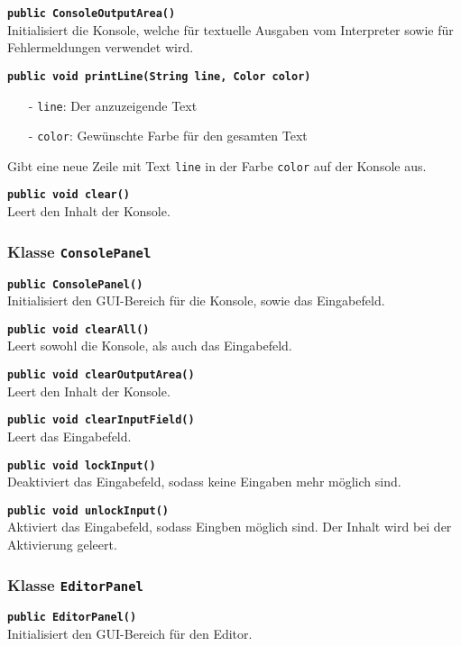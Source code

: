 \documentclass[parskip=full,11pt,twoside]{scrartcl}
\begin{document}
\textbf{\texttt{public ConsoleOutputArea()}}\\
Initialisiert die Konsole, welche für textuelle Ausgaben vom Interpreter sowie für Fehlermeldungen verwendet wird.

\textbf{\texttt{public void printLine(String line, Color color)}}
\begin{itemize}[noitemsep]
	\item[-] \texttt{line}: Der anzuzeigende Text
	\item[-] \texttt{color}: Gewünschte Farbe für den gesamten Text
\end{itemize}
Gibt eine neue Zeile mit Text \texttt{line} in der Farbe \texttt{color} auf der Konsole aus.

\textbf{\texttt{public void clear()}}\\
Leert den Inhalt der Konsole.

\subsubsection{Klasse \texttt{ConsolePanel}}

\textbf{\texttt{public ConsolePanel()}}\\
Initialisiert den GUI-Bereich für die Konsole, sowie das Eingabefeld.

\textbf{\texttt{public void clearAll()}}\\
Leert sowohl die Konsole, als auch das Eingabefeld.

\textbf{\texttt{public void clearOutputArea()}}\\
Leert den Inhalt der Konsole.

\textbf{\texttt{public void clearInputField()}}\\
Leert das Eingabefeld.

\textbf{\texttt{public void lockInput()}}\\
Deaktiviert das Eingabefeld, sodass keine Eingaben mehr möglich sind.

\textbf{\texttt{public void unlockInput()}}\\
Aktiviert das Eingabefeld, sodass Eingben möglich sind. Der Inhalt wird bei der Aktivierung geleert.

\subsubsection{Klasse \texttt{EditorPanel}}

\textbf{\texttt{public EditorPanel()}}\\
Initialisiert den GUI-Bereich für den Editor.
\end{document}
